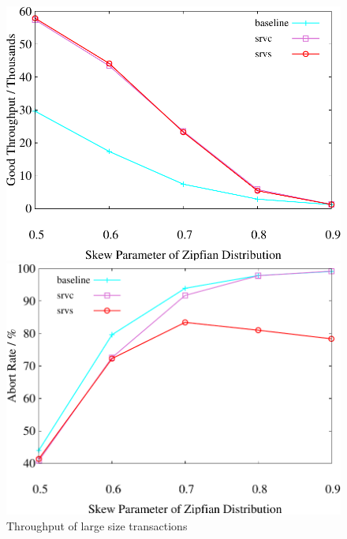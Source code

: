 \begin{figure}[t]
    \centering
        \begin{minipage}[b]{0.32\linewidth}
        \centering
        \includegraphics[width=\textwidth]{./exp_fig/weighted_size/tps_1}
        \vspace{-2em}
        \caption{Throughput of large size transactions}
        \label{fig:weighted:tps1}
    \end{minipage}
    \begin{minipage}[b]{0.32\linewidth}
        \centering
        \includegraphics[width=\textwidth]{./exp_fig/weighted_size/abort_1}
        \vspace{-2em}

\end{minipage}
\end{figure}
